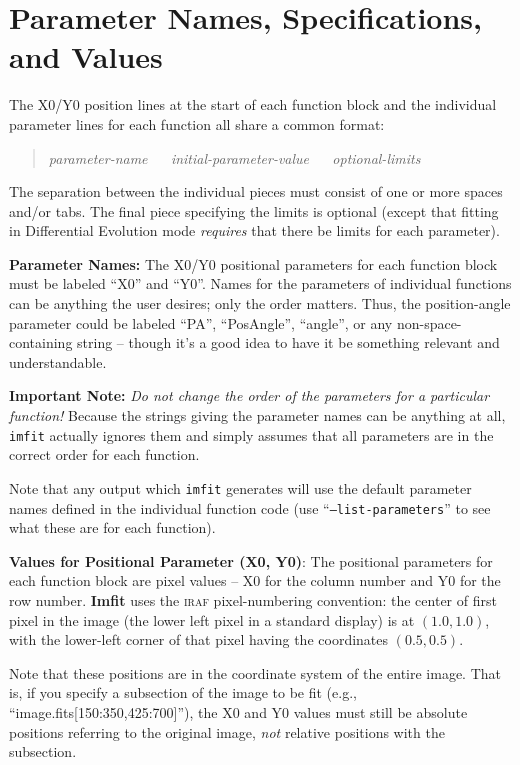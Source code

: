 \documentclass[10pt,a4paper,article]{memoir}
\newcommand{\Imfit}{\textbf{Imfit}}
\newcommand{\imfitprog}{\texttt{imfit}}
\begin{document}
\section{Parameter Names, Specifications, and Values}

The X0/Y0 position lines at the start of each function block and the
individual parameter lines for each function all share a common format:
\begin{quote}
\textit{parameter-name} ~~ \textit{initial-parameter-value} ~~ \textit{optional-limits}
\end{quote}
The separation between the individual pieces must consist of one or more spaces
and/or tabs. The final piece specifying the limits is optional (except that
fitting in Differential Evolution mode \textit{requires} that there be limits
for each parameter).

\bigskip

\textbf{Parameter Names:} The X0/Y0 positional parameters for each
function block must be labeled ``X0'' and ``Y0''. Names for the
parameters of individual functions can be anything the user desires;
only the order matters. Thus, the position-angle parameter could be
labeled ``PA'', ``PosAngle'', ``angle'', or any non-space-containing
string -- though it's a good idea to have it be something relevant
and understandable.

\textbf{Important Note:} \textit{Do not change the order of the parameters
for a particular function!}  Because the strings giving the parameter names
can be anything at all, \imfitprog{} actually ignores them and simply assumes
that all parameters are in the correct order for each function.

Note that any output which \imfitprog{} generates will use the default parameter
names defined in the individual function code (use ``\texttt{--list-parameters}''
to see what these are for each function).

\bigskip

\textbf{Values for Positional Parameter (X0, Y0)}: The positional parameters
for each function block are pixel values -- X0 for the column number and
Y0 for the row number. \Imfit{} uses the \textsc{iraf} pixel-numbering
convention: the center of first pixel in the image (the lower left pixel
in a standard display) is at $(1.0,1.0)$, with the lower-left corner of that
pixel having the coordinates $(0.5,0.5)$.

Note that these positions are in the coordinate system of the entire
image. That is, if you specify a subsection of the image to be fit
(e.g., ``image.fits[150:350,425:700]''), the X0 and Y0 values must still
be absolute positions referring to the original image, \textit{not} relative
positions with the subsection.
\end{document}
